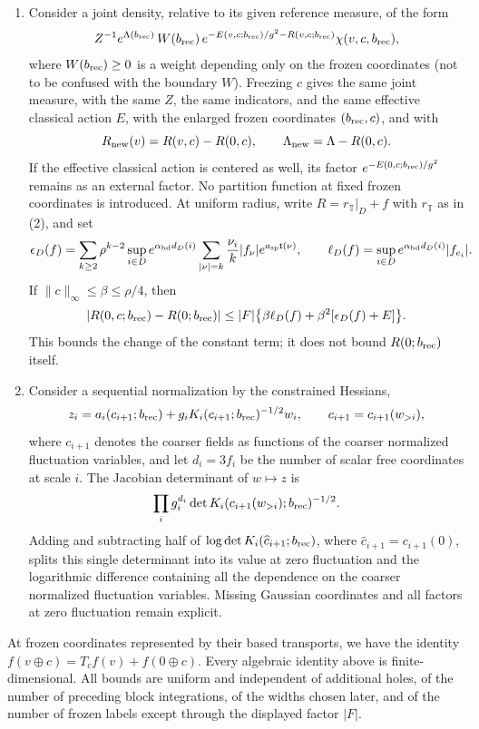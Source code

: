 \begin{lemma}
\begin{enumerate}
\item Consider a joint density, relative to its given reference measure, of the form
\[
 Z^{-1}e^{\Lambda(b_{\mathrm{rec}})}\,W(b_{\mathrm{rec}})\,
             e^{-E(v,c;b_{\mathrm{rec}})/g^2-R(v,c;b_{\mathrm{rec}})}\chi(v,c,b_{\mathrm{rec}}),
\]
where $W(b_{\mathrm{rec}})\ge0$ is a weight depending only on the frozen coordinates (not to be confused with the boundary $W$). Freezing $c$ gives the same joint measure, with the same $Z$, the same indicators, and the same effective classical action $E$, with the enlarged frozen coordinates $(b_{\mathrm{rec}},c)$, and with
\[
 R_{\mathrm{new}}(v)=R(v,c)-R(0,c),\qquad
 \Lambda_{\mathrm{new}}=\Lambda-R(0,c).
\]
If the effective classical action is centered as well, its factor $e^{-E(0,c;b_{\mathrm{rec}})/g^2}$ remains as an external factor. No partition function at fixed frozen coordinates is introduced. At uniform radius, write $R=r_{\mathbb T}|_D+f$ with $r_{\mathbb T}$ as in (2), and set
\[
 \epsilon_D(f)=\sum_{k\ge2}\rho^{k-2}\sup_{i\in D}
     e^{\alpha_{\mathrm{bd}} d_D(i)}\sum_{|\nu|=k}\frac{\nu_i}{k}|f_\nu|e^{a_{\mathrm{sp}}\mathsf t(\nu)},
 \qquad\ell_D(f)=\sup_{i\in D}e^{\alpha_{\mathrm{bd}} d_D(i)}|f_{e_i}|.
\]
If $\|c\|_\infty\le\beta\le\rho/4$, then
\[
 |R(0,c;b_{\mathrm{rec}})-R(0;b_{\mathrm{rec}})|
 \le |F|\bigl\{\beta\ell_D(f)+\beta^2[\epsilon_D(f)+E]\bigr\}.
\]
This bounds the change of the constant term; it does not bound $R(0;b_{\mathrm{rec}})$ itself.
\item Consider a sequential normalization by the constrained Hessians,
\[
 z_i=a_i(c_{i+1};b_{\mathrm{rec}})+g_iK_i(c_{i+1};b_{\mathrm{rec}})^{-1/2}w_i,
 \qquad c_{i+1}=c_{i+1}(w_{>i}),
\]
where $c_{i+1}$ denotes the coarser fields as functions of the coarser normalized fluctuation variables, and let $d_i=3f_i$ be the number of scalar free coordinates at scale $i$. The Jacobian determinant of $w\mapsto z$ is
\[
 \prod_i g_i^{d_i}
          \det K_i(c_{i+1}(w_{>i});b_{\mathrm{rec}})^{-1/2}.
\]
Adding and subtracting half of $\log\det K_i(\widehat c_{i+1};b_{\mathrm{rec}})$, where $\widehat c_{i+1}=c_{i+1}(0)$, splits this single determinant into its value at zero fluctuation and the logarithmic difference containing all the dependence on the coarser normalized fluctuation variables. Missing Gaussian coordinates and all factors at zero fluctuation remain explicit.
\end{enumerate}
At frozen coordinates represented by their based transports, we have the identity $f(v\oplus c)=T_cf(v)+f(0\oplus c)$. Every algebraic identity above is finite-dimensional. All bounds are uniform and independent of additional holes, of the number of preceding block integrations, of the widths chosen later, and of the number of frozen labels except through the displayed factor $|F|$.
\end{lemma}

